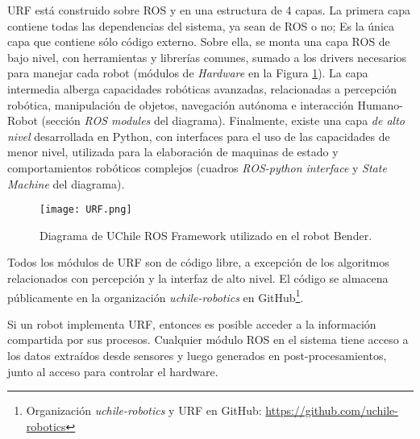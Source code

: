 URF está construido sobre ROS y en una estructura de 4 capas. La primera capa contiene todas las dependencias del sistema, ya sean de ROS o no; Es la única capa que contiene sólo código externo. Sobre ella, se monta una capa ROS de bajo nivel, con herramientas y librerías comunes, sumado a los drivers necesarios para manejar cada robot (módulos de \textit{Hardware} en la Figura \ref{img:URF}). La capa intermedia alberga capacidades robóticas avanzadas, relacionadas a percepción robótica, manipulación de objetos, navegación autónoma e interacción Humano-Robot (sección \textit{ROS modules} del diagrama). Finalmente, existe una capa \textit{de alto nivel} desarrollada en Python, con interfaces para el uso de las capacidades de menor nivel, utilizada para la elaboración de maquinas de estado y comportamientos robóticos complejos (cuadros \textit{ROS-python interface} y \textit{State Machine} del diagrama).

\begin{figure}[!h]
	\centering
	\texttt{[image: URF.png]}
	\caption{\small Diagrama de UChile ROS Framework utilizado en el robot Bender.}
	\label{img:URF}
\end{figure}

Todos los módulos de URF son de código libre, a excepción de los algoritmos relacionados con percepción y la interfaz de alto nivel. El código se almacena públicamente en la organización \textit{uchile-robotics} en GitHub\footnote{Organización \textit{uchile-robotics} y URF en GitHub: \url{https://github.com/uchile-robotics}}.





Si un robot implementa URF, entonces es posible acceder a la información compartida por sus procesos. Cualquier módulo ROS en el sistema tiene acceso a los datos extraídos desde sensores y luego generados en post-procesamientos, junto al acceso para controlar el hardware.

